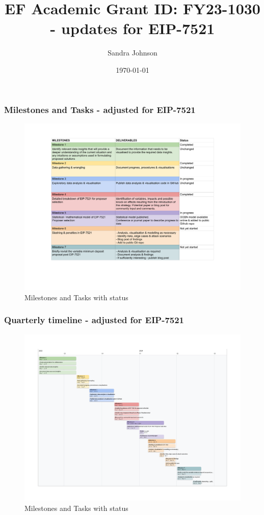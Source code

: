 \documentclass{beamer}
\title{EF Academic Grant ID: FY23-1030 - updates for EIP-7521}
\author{Sandra Johnson}
\date{\today}
\begin{document}
\frame{\titlepage}

\frame
{
  \frametitle{Milestones and Tasks - adjusted for EIP-7521}
	\begin{figure}[htbp]
	\begin{center}
		\includegraphics[width=\textwidth]{images/EFGrantTasks-adjusted-for-EIP7521.pdf}
	\caption{Milestones and Tasks with status}
	\label{tasks}
	\end{center}
	\end{figure}

}

\frame
{
  \frametitle{Quarterly timeline - adjusted for EIP-7521}
	\begin{figure}[htbp]
	\begin{center}
		\includegraphics[width=\textwidth]{images/EFGrantTimeline-adjusted-for-EIP7521_quarterly.pdf}
	\caption{Milestones and Tasks with status}
	\label{tasks}
	\end{center}
	\end{figure}

}
\end{document}
